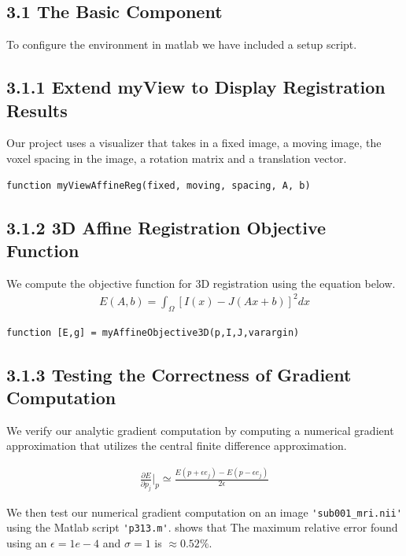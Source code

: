 \documentclass{article}
\begin{document}
	\begin{par}
		\section*{3.1 The Basic Component}
		To configure the environment in matlab we have included a setup script.
		
		
		\subsection*{3.1.1 Extend myView to Display Registration Results}
			Our project uses a visualizer that takes in a fixed image, a moving image, the voxel spacing in the image, a rotation matrix and a translation vector. 
			\begin{lstlisting}
function myViewAffineReg(fixed, moving, spacing, A, b)
			\end{lstlisting}
%			
			
		\subsection*{3.1.2 3D Affine Registration Objective Function}
			We compute the objective function for 3D registration using the equation below.
			\begin{align*}
				E(A,b) = \int_{\Omega} [ I(x) - J(Ax+b)]^{2} dx
			\end{align*}

			\begin{lstlisting}
function [E,g] = myAffineObjective3D(p,I,J,varargin)
			\end{lstlisting}
			

		\subsection*{3.1.3 Testing the Correctness of Gradient Computation}
			We verify our analytic gradient computation by computing a numerical gradient approximation that utilizes the central finite difference approximation. 

			\begin{align*}
				\frac{\partial E}{\partial p_{j}} |_{p} \simeq  \frac{E(p + \epsilon e_{j}) - E(p - \epsilon e_{j})}{2 \epsilon}
			\end{align*}

			We then test our numerical gradient computation on an image \lstinline|'sub001_mri.nii'| using the Matlab script \lstinline|'p313.m'|. shows that The maximum relative error found using an $\epsilon = 1e-4$ and $\sigma = 1$ is  $\approx 0.52\%$.
			

\end{par}
\end{document}
